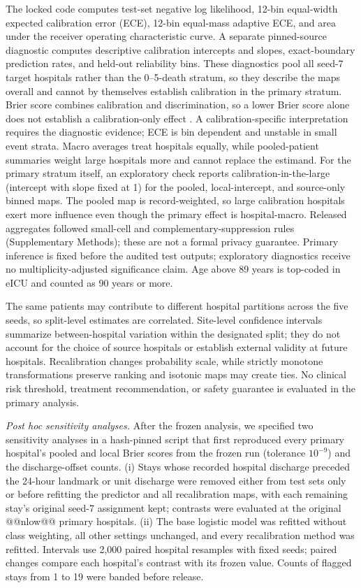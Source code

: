 \documentclass[11pt]{article}
\begin{document}
The locked code computes test-set negative log likelihood, 12-bin equal-width expected calibration error (ECE), 12-bin equal-mass adaptive ECE, and area under the receiver operating characteristic curve. A separate pinned-source diagnostic computes descriptive calibration intercepts and slopes, exact-boundary prediction rates, and held-out reliability bins. These diagnostics pool all seed-7 target hospitals rather than the 0--5-death stratum, so they describe the maps overall and cannot by themselves establish calibration in the primary stratum. Brier score combines calibration and discrimination, so a lower Brier score alone does not establish a calibration-only effect \cite{r3}. A calibration-specific interpretation requires the diagnostic evidence; ECE is bin dependent and unstable in small event strata. Macro averages treat hospitals equally, while pooled-patient summaries weight large hospitals more and cannot replace the estimand. For the primary stratum itself, an exploratory check reports calibration-in-the-large (intercept with slope fixed at 1) for the pooled, local-intercept, and source-only binned maps. The pooled map is record-weighted, so large calibration hospitals exert more influence even though the primary effect is hospital-macro. Released aggregates followed small-cell and complementary-suppression rules (Supplementary Methods); these are not a formal privacy guarantee. Primary inference is fixed before the audited test outputs; exploratory diagnostics receive no multiplicity-adjusted significance claim. Age above 89 years is top-coded in eICU and counted as 90 years or more.

The same patients may contribute to different hospital partitions across the five seeds, so split-level estimates are correlated. Site-level confidence intervals summarize between-hospital variation within the designated split; they do not account for the choice of source hospitals or establish external validity at future hospitals. Recalibration changes probability scale, while strictly monotone transformations preserve ranking and isotonic maps may create ties. No clinical risk threshold, treatment recommendation, or safety guarantee is evaluated in the primary analysis.

\textit{Post hoc sensitivity analyses.} After the frozen analysis, we specified two sensitivity analyses in a hash-pinned script that first reproduced every primary hospital's pooled and local Brier scores from the frozen run (tolerance $10^{-9}$) and the discharge-offset counts. (i) Stays whose recorded hospital discharge preceded the 24-hour landmark or unit discharge were removed either from test sets only or before refitting the predictor and all recalibration maps, with each remaining stay's original seed-7 assignment kept; contrasts were evaluated at the original @@nlow@@ primary hospitals. (ii) The base logistic model was refitted without class weighting, all other settings unchanged, and every recalibration method was refitted. Intervals use 2,000 paired hospital resamples with fixed seeds; paired changes compare each hospital's contrast with its frozen value. Counts of flagged stays from 1 to 19 were banded before release.
\end{document}
